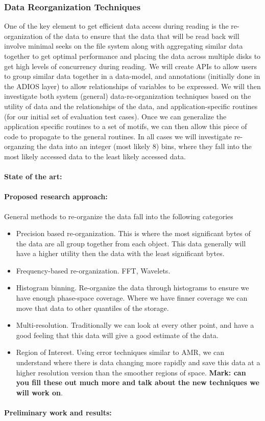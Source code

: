 \subsubsection{Data Reorganization Techniques}
One of the key element to get efficient data access during reading is the re-organization of the
data to ensure that the data that will be read back will involve minimal seeks on the file system 
along with aggregating similar data together to get optimal performance and placing the data
across multiple disks to get high levels of concurrency during reading. We will create APIs to
allow users to group similar data together in a data-model, and annotations (initially done in the
ADIOS layer) to allow relationships of variables to be expressed. We will then investigate both
system (general) data-re-organization techniques based on the utility of data and the relationships
of the data, and application-specific routines (for our initial set of evaluation test cases).  Once
we can generalize the application specific routines to a set of motifs, we can then allow this piece
of code to propagate to the general routines. In all cases we will investigate re-organzing the data
into an integer (most likely 8) bins, where they fall into the most likely accessed data to the least
likely accessed data.




\paragraph{State of the art:}
\paragraph{Proposed research approach:}
General methods to re-organize the data fall into the following categories
\begin{itemize}
\item Precision based re-organization. This is where the most significant bytes of the data are
all group together from each object. This data generally will have a higher utility then the data with
the least significant bytes.

\item Frequency-based re-organization. FFT, Wavelets.

\item Histogram binning. Re-organize the data through histograms to ensure we have enough
phase-space coverage. Where we have finner coverage we can move that data to other
quantiles of the storage. 

\item Multi-resolution. Traditionally we can look at every other point, and have a good feeling that 
this data will give a good estimate of the data.

\item Region of Interest. Using error techniques similar to AMR, we can understand where there
is data changing more rapidly and save this data at a higher resolution version than the smoother
regions of space.
{\bf Mark: can you fill these out much more and talk about the new techniques we will work on}.
\end{itemize}
\paragraph{Preliminary work and results:}